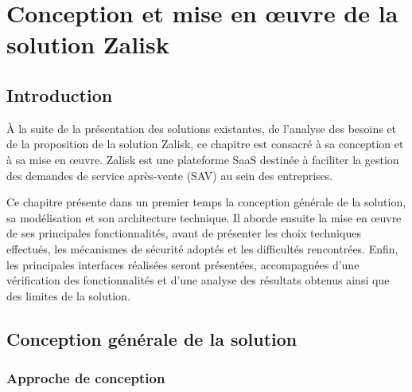 \documentclass[12pt, a4paper]{report}
\begin{document}
\setcounter{chapter}{2}

\chapter{Conception et mise en œuvre de la solution Zalisk}
\label{chap:conception-mise-en-oeuvre}

\section{Introduction}
\label{sec:introduction}

À la suite de la présentation des solutions existantes, de l'analyse des besoins et de la proposition de la solution Zalisk, ce chapitre est consacré à sa conception et à sa mise en œuvre. Zalisk est une plateforme SaaS destinée à faciliter la gestion des demandes de service après-vente (SAV) au sein des entreprises.

Ce chapitre présente dans un premier temps la conception générale de la solution, sa modélisation et son architecture technique. Il aborde ensuite la mise en œuvre de ses principales fonctionnalités, avant de présenter les choix techniques effectués, les mécanismes de sécurité adoptés et les difficultés rencontrées. Enfin, les principales interfaces réalisées seront présentées, accompagnées d'une vérification des fonctionnalités et d'une analyse des résultats obtenus ainsi que des limites de la solution.

\section{Conception générale de la solution}
\label{sec:conception-generale}

\subsection{Approche de conception}
\label{subsec:approche-conception}
\end{document}
